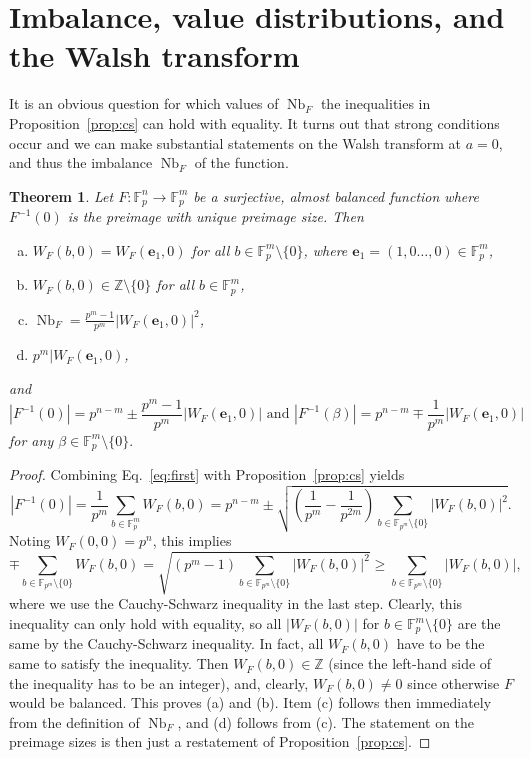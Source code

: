 \documentclass[11pt]{article}
\newcommand{\Z}{\mathbb Z}
\newcommand{\F}{\mathbb F}
\DeclareMathOperator{\Nb}{Nb}
\theoremstyle{plain}
\newtheorem{theorem}{Theorem}[section]
\theoremstyle{definition}
\numberwithin{theorem}{section}
\numberwithin{equation}{section}
\numberwithin{table}{section}
\numberwithin{figure}{section}
\begin{document}
{\section{Imbalance, value distributions, and the Walsh transform}\label{sec 3}

It is an obvious question for which values of $\Nb_F$ the inequalities in Proposition~\ref{prop:cs} can hold with equality. It turns out that strong conditions occur and we can make substantial statements on the Walsh transform  {at $a=0$}, and thus the imbalance $\Nb_F$ of the function.

\begin{theorem} \label{thm:AB}
       Let $F \colon \F_p^n \rightarrow \F_p^m$ be a surjective, almost balanced function where $F^{-1}(0)$ is the preimage with unique preimage size. Then 
    \begin{enumerate}[(a)]
        \item  $W_F(b,0)=W_F(\mathbf{e}_1,0)$ for all $b \in \F_p^m\setminus\{0\}$, where $\mathbf{e}_1=(1,0\dots,0)\in \F_p^m$,
        \item $W_F(b,0) \in \Z \setminus\{0\}$  for all $b \in \F_p^m$,
        \item $\Nb_F=\frac{p^m-1}{p^m}|W_F(\mathbf{e}_1,0)|^2$,
        \item $p^m|W_F(\mathbf{e}_1,0)$,
    \end{enumerate} 
    and
    \[|F^{-1}(0)|=p^{n-m} \pm \frac{p^m-1}{p^m}|W_F(\mathbf{e}_1,0)| \text{ and }|F^{-1}(\beta)|=p^{n-m} \mp \frac{1}{p^m}|W_F(\mathbf{e}_1,0)|\]
    for any $\beta \in \F_p^m\setminus \{0\}.$
\end{theorem}
\begin{proof}
    Combining Eq.~\eqref{eq:first} with Proposition~\ref{prop:cs} yields
    \[|F^{-1}(0)|=\frac{1}{p^m}\sum_{b \in \F_p^m}W_F(b,0) = p^{n-m} \pm \sqrt{\left(\frac{1}{p^m}-\frac{1}{p^{2m}}\right)\sum_{b \in \F_{p^m}\setminus\{0\}}|W_F(b,0)|^2}.\]
    Noting $W_F(0,0)=p^n$, this implies
    \[\mp \sum_{b \in \F_{p^m}\setminus\{0\}}W_F(b,0)=\sqrt{(p^m-1)\sum_{b \in \F_{p^m}\setminus\{0\}}|W_F(b,0)|^2} \geq \sum_{b \in \F_{p^m}\setminus\{0\}}|W_F(b,0)|,\]
    where we use the Cauchy-Schwarz inequality in the last step. Clearly, this inequality can only hold with equality, so all $|W_F(b,0)|$ for $b\in \F_p^m\setminus \{0\}$ are the same by the Cauchy-Schwarz inequality. In fact, all $W_F(b,0)$ have to be the same to satisfy the inequality. Then $W_F(b,0) \in \Z$ (since the left-hand side of the inequality has to be an integer), and, clearly, $W_F(b,0)\neq 0$ since otherwise $F$ would be balanced. This proves (a) and (b). Item (c) follows then immediately from the definition of $\Nb_F$, and (d) follows from (c). The statement on the preimage sizes is then just a restatement of Proposition~\ref{prop:cs}.
    \end{proof}

}
\end{document}
